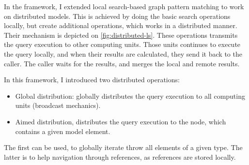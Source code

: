 In the framework, I extended local search-based graph pattern matching to work on distributed models.
This is achieved by doing the basic search operations locally, but create additional operations, which works in a distributed manner. 
Their mechanism is depicted on \autoref{fig:distributed-ls}.
These operations transmits the query execution to other computing units.
Those units continues to execute the query locally, and when their results are calculated, they send it back to the caller.
The caller waits for the results, and merges the local and remote results.

In this framework, I introduced two distributed operations:
\begin{itemize}
	\item Global distribution: globally distributes the query execution to all computing units (broadcast mechanics).
	\item Aimed distribution, distributes the query execution to the node, which contains a given model element.
\end{itemize}

The first can be used, to globally iterate throw all elements of a given type. The latter is to help navigation through references, as references are stored locally.





